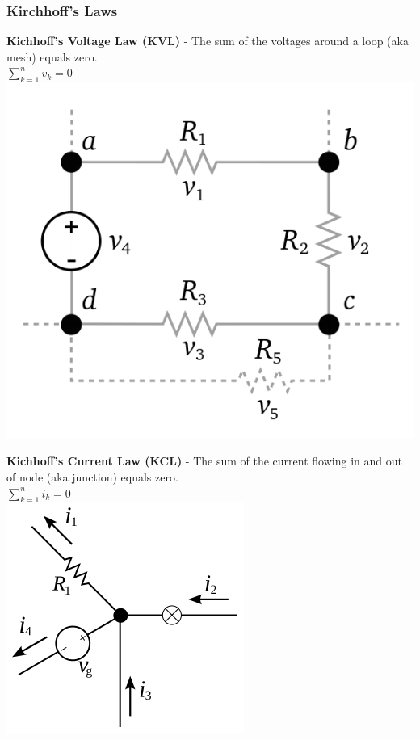 \documentclass[fleqn]{beamer} %
\newcommand{\sectionIIsubsectionIIItitle}{Kirchhoff's Laws}
\begin{document}
			\begin{frame}
				\frametitle{\sectionIIsubsectionIIItitle}

				\begin{multicols}{2}
					{\bf Kichhoff's Voltage Law (KVL)} - The sum of the voltages around a loop (aka mesh) equals zero.\\ $ \sum\limits_{k=1}^{n} v_k = 0 $ \\
					\includegraphics[scale=.20]{images/Kirchhoffs_voltage_law.png} 

					{\bf Kichhoff's Current  Law (KCL)} - The sum of the current flowing in and out of  node (aka junction) equals zero. \\ $ \sum\limits_{k=1}^{n} i_k = 0 $ \vspace{2mm}\\
					\includegraphics[scale=.4]{images/Kirchhoffs_current_law.png} 
				\end{multicols}

			\end{frame}
\end{document}
